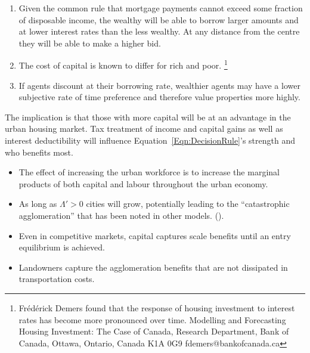 \begin{enumerate}
\item Given the  common rule that mortgage payments cannot exceed some fraction of disposable income, the wealthy will be able to borrow larger amounts and at lower interest rates than the less wealthy. At any distance from the centre they will be able to make a higher bid.

\item The cost of capital is known to differ for rich and poor. \footnote{Fr\'ed\'erick Demers found that the response of housing investment to interest rates has become more pronounced over time. Modelling and Forecasting Housing Investment: The Case of Canada,  Research Department, Bank of Canada, Ottawa, Ontario, Canada K1A 0G9 fdemers@bankofcanada.ca} 


\item If agents discount at their borrowing rate, wealthier agents may have a lower subjective rate of time preference and therefore value properties more highly. 
\end{enumerate}
The implication is that those with more capital will be at an advantage in the urban housing  market. Tax treatment of income and capital gains as well as interest deductibility will influence Equation~\ref{Eqn:DecisionRule}'s strength and who benefits most. 

\begin{itemize}
\item The effect of increasing the urban workforce is to increase the marginal products of  both capital and labour throughout the urban economy.%
 \item  As long as $\Lambda'>0$ cities will  grow, potentially leading to the ``catastrophic agglomeration''  that has been noted in other models.  (\cite{fujitaSpatialEconomyCities1999, baldwinAgglomerationRegionalGrowth2004, krugmanIncreasingReturnsEconomic1991, gurwitzCatastrophicAgglomeration2019}).%
\item Even in competitive markets, capital captures scale benefits until an entry equilibrium is achieved.
\item Landowners  capture the agglomeration benefits that are not dissipated in transportation costs.
\end{itemize}

